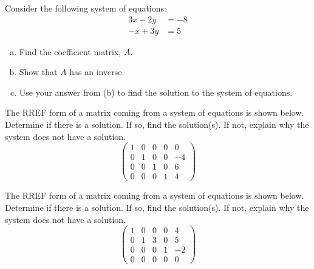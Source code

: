 \documentclass[11pt,letterpaper]{article}
\begin{document}

 Consider the following system of equations:
	\[
	\begin{aligned}
	3x - 2y&= -8 \\
	-x + 3y&= 5
	\end{aligned}
	\]

\begin{enumerate}[(a)]
\item Find the coefficient matrix, $A$. 
\item Show that $A$ has an inverse. 
\item Use your answer from (b) to find the solution to the system of equations. 
\end{enumerate}



\newpage



 The RREF form of a matrix coming from a system of equations is shown below. Determine if there is a solution. If so, find the solution(s). If not, explain why the system does not have a solution. 
	\[
	\begin{pmatrix}
	1 & 0 & 0 & 0 & 0 \\
	0 & 1 & 0 & 0 & -4 \\
	0 & 0 & 1 & 0 & 6 \\
	0 & 0 & 0 & 1 & 4
	\end{pmatrix}
	\]



\newpage



 The RREF form of a matrix coming from a system of equations is shown below. Determine if there is a solution. If so, find the solution(s). If not, explain why the system does not have a solution. 
	\[
	\begin{pmatrix}
	1 & 0 & 0 & 0 & 4 \\
	0 & 1 & 3 & 0 & 5 \\
	0 & 0 & 0 & 1 & -2 \\
	0 & 0 & 0 & 0 & 0
	\end{pmatrix}
	\]
\end{document}
